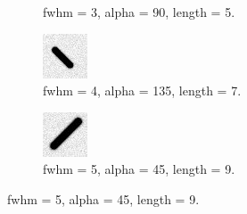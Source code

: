 \begin{figure}[!h]
\begin{subfigure}{.23\textwidth}
        \caption{fwhm = 3, alpha = 90, length = 5.}
        \label{fig:streakB}
    \end{subfigure}
    \begin{subfigure}{.23\textwidth}
        \centering
        \includegraphics[width=\textwidth]{images/streakC.png}
        \caption{fwhm = 4, alpha = 135, length = 7.}
        \label{fig:streakC}
    \end{subfigure}
    \begin{subfigure}{.23\textwidth}
        \centering
        \includegraphics[width=\textwidth]{images/streakD.png}
        \caption{fwhm = 5, alpha = 45, length = 9.}
        \label{fig:streakD}
    \end{subfigure}


\end{figure}
